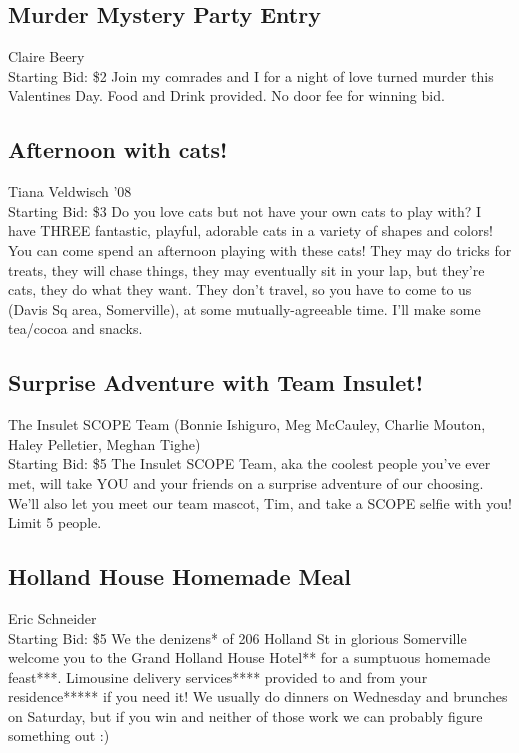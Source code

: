 \documentclass[11pt]{article}
\begin{document}
\subsection{Murder Mystery Party Entry}
Claire Beery
\\
Starting Bid: \$2
\newline
Join my comrades and I for a night of love turned murder this Valentines Day. Food and Drink provided. No door fee for winning bid.
\subsection{Afternoon with cats!}
Tiana Veldwisch '08
\\
Starting Bid: \$3
\newline
Do you love cats but not have your own cats to play with? I have THREE fantastic, playful, adorable cats in a variety of shapes and colors! You can come spend an afternoon playing with these cats! They may do tricks for treats, they will chase things, they may eventually sit in your lap, but they're cats, they do what they want. They don't travel, so you have to come to us (Davis Sq area, Somerville), at some mutually-agreeable time. I'll make some tea/cocoa and snacks.
\subsection{Surprise Adventure with Team Insulet!}
The Insulet SCOPE Team (Bonnie Ishiguro, Meg McCauley, Charlie Mouton, Haley Pelletier, Meghan Tighe)
\\
Starting Bid: \$5
\newline
The Insulet SCOPE Team, aka the coolest people you've ever met, will take YOU and your friends on a surprise adventure of our choosing. We'll also let you meet our team mascot, Tim, and take a SCOPE selfie with you! Limit 5 people.
\subsection{Holland House Homemade Meal}
Eric Schneider
\\
Starting Bid: \$5
\newline
We the denizens* of 206 Holland St in glorious Somerville welcome you to the Grand Holland House Hotel** for a sumptuous homemade feast***. Limousine delivery services**** provided to and from your residence***** if you need it! We usually do dinners on Wednesday and brunches on Saturday, but if you win and neither of those work we can probably figure something out :)
\end{document}

